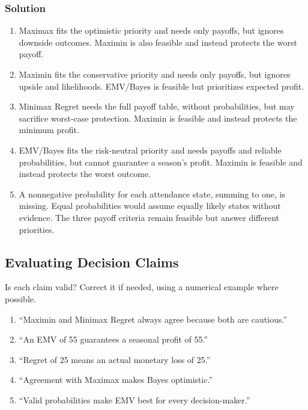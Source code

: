 \subsubsection*{Solution}
\begin{enumerate}
\item Maximax fits the optimistic priority and needs only payoffs, but ignores downside outcomes. Maximin is also feasible and instead protects the worst payoff.
\item Maximin fits the conservative priority and needs only payoffs, but ignores upside and likelihoods. EMV/Bayes is feasible but prioritizes expected profit.
\item Minimax Regret needs the full payoff table, without probabilities, but may sacrifice worst-case protection. Maximin is feasible and instead protects the minimum profit.
\item EMV/Bayes fits the risk-neutral priority and needs payoffs and reliable probabilities, but cannot guarantee a season's profit. Maximin is feasible and instead protects the worst outcome.
\item A nonnegative probability for each attendance state, summing to one, is missing. Equal probabilities would assume equally likely states without evidence. The three payoff criteria remain feasible but answer different priorities.
\end{enumerate}

\subsection{Evaluating Decision Claims}\label{sec:c8-critique}
Is each claim valid? Correct it if needed, using a numerical example where possible.
\begin{enumerate}
\item ``Maximin and Minimax Regret always agree because both are cautious.''
\item ``An EMV of 55 guarantees a seasonal profit of 55.''
\item ``Regret of 25 means an actual monetary loss of 25.''
\item ``Agreement with Maximax makes Bayes optimistic.''
\item ``Valid probabilities make EMV best for every decision-maker.''
\end{enumerate}
